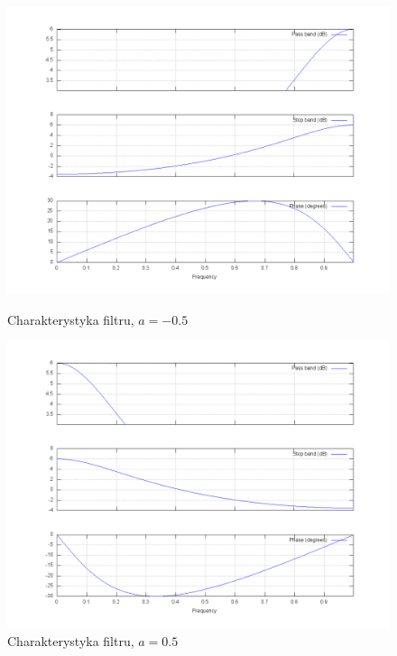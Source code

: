\documentclass[wide,a4paper,titlepage,12pt]{mwart}
\begin{document}
  \begin{figure}[htbp]
    \begin{center}
      \includegraphics[scale=.3]{out/fig11.png}
      \caption{\label{fig11} Charakterystyka filtru, $a=-0.5$}
      \includegraphics[scale=.3]{out/fig12.png}
      \caption{\label{fig12} Charakterystyka filtru, $a=0.5$}

    \end{center}
  \end{figure}
\end{document}

